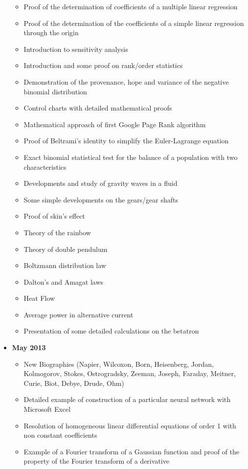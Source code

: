 \documentclass[12pt,a4paper,twoside,openright]{report}
\theoremstyle{definition}
\theoremstyle{itexmp}
\numberwithin{equation}{section}
\begin{document}
\begin{itemize}
\begin{itemize}[noitemsep]
				\item Proof of the determination of coefficients of a multiple linear regression
				\item Proof of the determination of the coefficients of a simple linear regression through the origin
				\item Introduction to sensitivity analysis
				\item Introduction and some proof on rank/order statistics
				\item Demonstration of the provenance, hope and variance of the negative binomial distribution
				\item Control charts with detailed mathematical proofs
				\item Mathematical approach of first Google Page Rank algorithm
				\item Proof of Beltrami's identity to simplify the Euler-Lagrange equation
				\item Exact binomial statistical test for the balance of a population with two characteristics
				\item Developments and study of gravity waves in a fluid
				\item Some simple developments on the gears/gear shafts
				\item Proof of skin's effect
				\item Theory of the rainbow
				\item Theory of double pendulum
				\item Boltzmann distribution law
				\item Dalton's and Amagat laws
				\item Heat Flow
				\item Average power in alternative current
				\item Presentation of some detailed calculations on the betatron
			\end{itemize}
		\item \textbf{May 2013}
			\begin{itemize}[noitemsep]
				\item New Biographies (Napier, Wilcoxon, Born, Heisenberg, Jordan, Kolmogorov, Stokes, Ostrogradsky, Zeeman, Joseph, Faraday, Meitner, Curie, Biot, Debye, Drude, Ohm)
				\item Detailed example of construction of a particular neural network with Microsoft Excel
				\item Resolution of homogeneous linear differential equations of order 1 with non constant coefficients
				\item Example of a Fourier transform of a Gaussian function and proof of the property of the Fourier transform of a derivative

\end{itemize}
\end{itemize}
\end{document}
